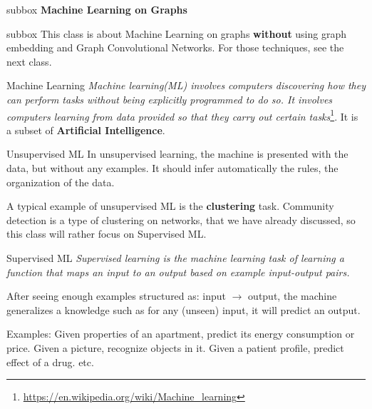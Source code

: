 \documentclass[a4paper,11pt]{book}
\begin{document}

\newpage



\begin{subbox}{subbox}{}
\centering
\Large{\textbf{Machine Learning on Graphs}}
\end{subbox}

\begin{subbox}{subbox}{}
This class is about Machine Learning on graphs \textbf{without} using graph embedding and Graph Convolutional Networks. For those techniques, see the next class.
\end{subbox}



\begin{textbox}{Machine Learning}
\textit{Machine learning(ML) involves computers discovering how they can perform tasks without being explicitly programmed to do so. It involves computers learning from data provided so that they carry out certain tasks}\footnote{\url{https://en.wikipedia.org/wiki/Machine_learning}}. It is a subset of \textbf{Artificial Intelligence}.

\end{textbox}




\begin{textbox}{Unsupervised ML}
In unsupervised learning, the machine is presented with the data, but without any examples. It should infer automatically the rules, the organization of the data.

A typical example of unsupervised ML is the \textbf{clustering} task. Community detection is a type of clustering on networks, that we have already discussed, so this class will rather focus on Supervised ML.
\end{textbox}


\begin{textbox}{Supervised ML}
\textit{Supervised learning is the machine learning task of learning a function that maps an input to an output based on example input-output pairs.}

After seeing enough examples structured as: input $\rightarrow$ output, the machine generalizes a knowledge such as for any (unseen) input, it will predict an output.

Examples: Given properties of an apartment, predict its energy consumption or price. Given a picture, recognize objects in it. Given a patient profile, predict effect of a drug. etc.

\end{textbox}
\end{document}
